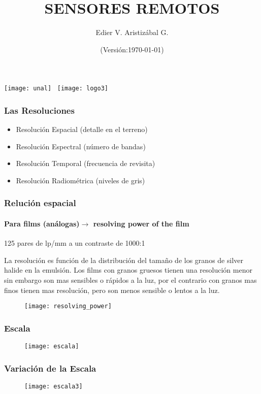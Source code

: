 \documentclass[14pt]{beamer}
\title[Resolución]{SENSORES REMOTOS}
\author[Edier Aristizábal]{Edier V. Aristizábal G.}
\institute{\emph{evaristizabalg@unal.edu.co}}
\date{(Versión:\today)}
\begin{document}
\begin{frame}
\titlepage
\centering
	\texttt{[image: unal]}\hspace*{4.75cm}~%
   	\texttt{[image: logo3]} 
\end{frame}
\begin{frame}
\frametitle{Las Resoluciones}
 \begin{itemize}
\item Resolución Espacial (detalle en el terreno)
\item Resolución Espectral (número de bandas)
\item Resolución Temporal (frecuencia de revisita) 
\item Resolución Radiométrica (niveles de gris)
  \end{itemize}
\end{frame}
\begin{frame}
\frametitle{Relución espacial}
\framesubtitle{Para films (análogas)$\rightarrow$ resolving power of the film}
\begin{center}
125 pares de lp/mm a un contraste de 1000:1
\end{center}
\scriptsize{
La resolución es función de la distribución del tamaño de los granos de silver halide en la emulsión. Los films con granos gruesos tienen una resolución menor sin embargo son mas sensibles o rápidos a la luz, por el contrario con granos mas finos tienen mas resolución, pero son menos sensible o lentos a la luz.
}
 \begin{figure}
    \centering
    \texttt{[image: resolving\_power]}
  \end{figure}
\end{frame}
\begin{frame}
\frametitle{Escala}
 \begin{figure}
    \centering
    \texttt{[image: escala]}
  \end{figure}
\end{frame}
\begin{frame}
\frametitle{Variación de la Escala}
 \begin{figure}
    \centering
    \texttt{[image: escala3]}
  \end{figure}
\end{frame}
\end{document}
